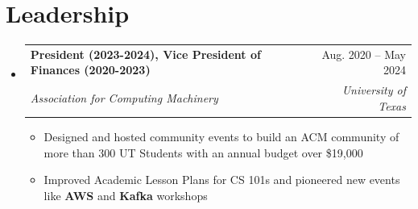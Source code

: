 \documentclass[letterpaper,11pt]{article}
\makeatletter
\newcommand{\resumeItem}[1]{
  \item\small{
    {#1 \vspace{-4pt}}
  }
}
\newcommand{\resumeSubheading}[4]{
  \vspace{-2pt}\item
    \begin{tabular*}{0.97\textwidth}[t]{l@{\extracolsep{\fill}}r}
      \textbf{#1} & \footnotesize{#2} \\
      \textit{#3} & \footnotesize{\textit{#4}} \\
    \end{tabular*}\vspace{-7pt}
}
\newcommand{\resumeSubHeadingListStart}{\begin{itemize}[leftmargin=0.15in, label={}]}
\newcommand{\resumeSubHeadingListEnd}{\end{itemize}}
\newcommand{\resumeItemListStart}{\begin{itemize}}
\newcommand{\resumeItemListEnd}{\end{itemize}\vspace{-7pt}}
\makeatother
\begin{document}
\section{Leadership}
\resumeSubHeadingListStart

\resumeSubheading
{President (2023-2024), Vice President of Finances (2020-2023)}{Aug. 2020 -- May 2024}
{Association for Computing Machinery}{University of Texas}
\resumeItemListStart
\resumeItem{Designed and hosted community events to build an ACM community of more than 300 UT Students with an annual budget over \$19,000}
\resumeItem{Improved Academic Lesson Plans for CS 101s and pioneered new events like \textbf{AWS} and \textbf{Kafka} workshops}
\resumeItemListEnd
\resumeSubHeadingListEnd






\end{document}
